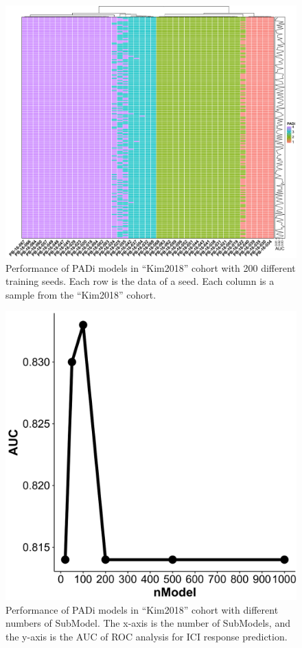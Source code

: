 \documentclass[
  12pt,
]{book}
\begin{document}
\begin{figure}

{\centering \includegraphics[width=0.9\linewidth]{./fig/model-no-01} 

}

\caption{Performance of PADi models in “Kim2018” cohort with 200 different training seeds. Each row is the data of a seed. Each column is a sample from the “Kim2018” cohort.}\label{fig:mn01}
\end{figure}

\begin{figure}

{\centering \includegraphics[width=0.5\linewidth]{./fig/model-no-02} 

}

\caption{Performance of PADi models in “Kim2018” cohort with different numbers of SubModel. The x-axis is the number of SubModels, and the y-axis is the AUC of ROC analysis for ICI response prediction.}\label{fig:mn02}
\end{figure}
\end{document}
